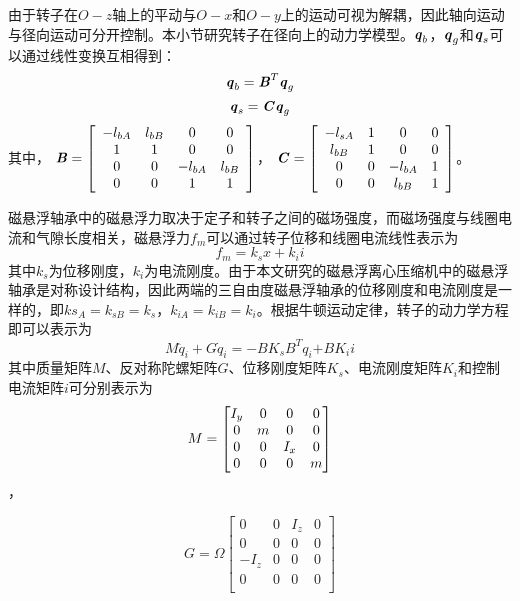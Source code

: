 由于转子在$ O-z $轴上的平动与$ O-x $和$ O-y $上的运动可视为解耦，因此轴向运动与径向运动可分开控制。本小节研究转子在径向上的动力学模型。$ \textbf{\textit{q}}_{b} $，$ \textbf{\textit{q}}_{g} $和$ \textbf{\textit{q}}_{s} $可以通过线性变换互相得到：
\begin{equation}
\label{eq2-1}
{\textbf{\textit{q}}_b} = {\textbf{\textit{B}}^T}{\textbf{\textit{q}}_g}
\end{equation}
\begin{equation}
\label{eq2-2}
{\textbf{\textit{q}}_s} = \textbf{\textit{C}}{\textbf{\textit{q}}_g}
\end{equation}
其中，
${\textbf{\textit{B}}} = \left[ {\begin{array}{*{20}{c}}
{ - {l_{bA}}}&{{l_{bB}}}&0&0\\
1&1&0&0\\
0&0&{ - {l_{bA}}}&{{l_{bB}}}\\
0&0&1&1
\end{array}} \right]$，
${\textbf{\textit{C}}} = \left[ {\begin{array}{*{20}{c}}
{ - {l_{sA}}}&{1}&0&0\\
{l_{bB}}&1&0&0\\
0&0&{ - {l_{bA}}}&{1}\\
0&0&{l_{bB}}&1
\end{array}} \right]$。

磁悬浮轴承中的磁悬浮力取决于定子和转子之间的磁场强度，而磁场强度与线圈电流和气隙长度相关，磁悬浮力$ {f_m} $可以通过转子位移和线圈电流线性表示为
\begin{equation}
\label{eq2-3}
{f_m} = {k_s}x + {k_i}i
\end{equation}
其中${k_s}$为位移刚度，${k_i}$为电流刚度。由于本文研究的磁悬浮离心压缩机中的磁悬浮轴承是对称设计结构，因此两端的三自由度磁悬浮轴承的位移刚度和电流刚度是一样的，即$ks_A = k_{sB} = k_s$，$k_{iA} = k_{iB} = k_i$。根据牛顿运动定律，转子的动力学方程即可以表示为
\begin{equation}
\label{eq2-4}
M{\ddot q_i} + G{\dot q_i} =  - B{{K}_{s}}{{B}^{T}}{{q}_i}{ + B}{{K}_{i}}{i}
\end{equation}
其中质量矩阵$M$、反对称陀螺矩阵$G$、位移刚度矩阵$K_s$、电流刚度矩阵$K_i$和控制电流矩阵$i$可分别表示为
$$M = \left[ {\begin{matrix}
   {{I_y}} & 0 & 0 & 0  \cr 
   0 & m & 0 & 0  \cr 
   0 & 0 & {{I_x}} & 0  \cr 
   0 & 0 & 0 & m  \cr 

 \end{matrix} } \right]$$，

$$G = \Omega \left[ {\begin{matrix}
   0 & 0 & {{I_z}} & 0  	\\
   0 & 0 & 0 & 0  			\\ 
   { - {I_z}} & 0 & 0 & 0  	\\ 
   0 & 0 & 0 & 0  			\\ 
 \end{matrix} } \right]$$


